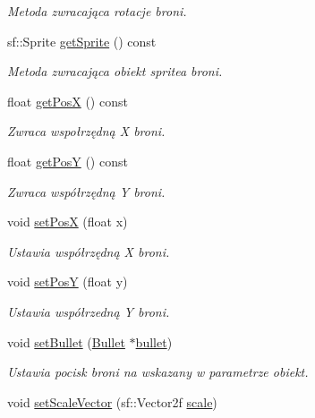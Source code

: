 \begin{DoxyCompactItemize}
\begin{DoxyCompactList}\small\item\em Metoda zwracająca rotacje broni. \end{DoxyCompactList}\item 
sf\+::\+Sprite \mbox{\hyperlink{class_weapon_a1da4c7c6528d560e2a183ecd6e65d27b}{get\+Sprite}} () const
\begin{DoxyCompactList}\small\item\em Metoda zwracająca obiekt sprite\textquotesingle{}a broni. \end{DoxyCompactList}\item 
float \mbox{\hyperlink{class_weapon_ac46e15594ab133d8bd9484f31675c087}{get\+PosX}} () const
\begin{DoxyCompactList}\small\item\em Zwraca wspołrzędną X broni. \end{DoxyCompactList}\item 
float \mbox{\hyperlink{class_weapon_a725696ea526b49b35b4219fdd7faa68e}{get\+PosY}} () const
\begin{DoxyCompactList}\small\item\em Zwraca współrzędną Y broni. \end{DoxyCompactList}\item 
void \mbox{\hyperlink{class_weapon_a889af631d759a2911045d699d6801623}{set\+PosX}} (float x)
\begin{DoxyCompactList}\small\item\em Ustawia współrzędną X broni. \end{DoxyCompactList}\item 
void \mbox{\hyperlink{class_weapon_acd2619f9d9d417cf655d53149ee53540}{set\+PosY}} (float y)
\begin{DoxyCompactList}\small\item\em Ustawia współrzedną Y broni. \end{DoxyCompactList}\item 
void \mbox{\hyperlink{class_weapon_addd624ea7d811b1bf61c2abb4a812f87}{set\+Bullet}} (\mbox{\hyperlink{class_bullet}{Bullet}} $\ast$\mbox{\hyperlink{class_weapon_a799874e40f4d2235ffa259eb46674fe5}{bullet}})
\begin{DoxyCompactList}\small\item\em Ustawia pocisk broni na wskazany w parametrze obiekt. \end{DoxyCompactList}\item 
void \mbox{\hyperlink{class_weapon_afc47346b4e4f0f41599fdaec6c47ae6d}{set\+Scale\+Vector}} (sf\+::\+Vector2f \mbox{\hyperlink{class_weapon_a425a9f9fc4bb9bf0e4de80855d3e2ac0}{scale}})

\end{DoxyCompactItemize}
